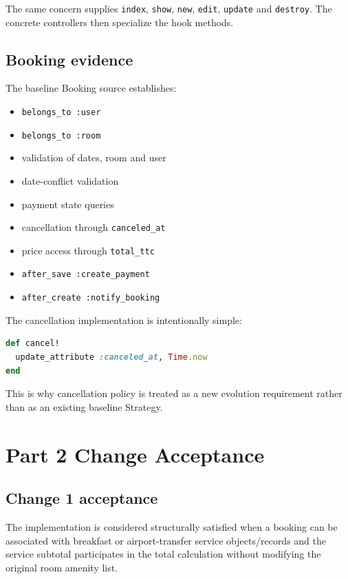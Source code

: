 \documentclass[10pt,a4paper]{article}
\newcommand{\code}[1]{\texttt{\small #1}}
\begin{document}
The same concern supplies \code{index}, \code{show}, \code{new}, \code{edit}, \code{update} and \code{destroy}. The concrete controllers then specialize the hook methods.

\subsection{Booking evidence}

The baseline Booking source establishes:

\begin{itemize}[leftmargin=*]
\item \code{belongs\_to :user}
\item \code{belongs\_to :room}
\item validation of dates, room and user
\item date-conflict validation
\item payment state queries
\item cancellation through \code{canceled\_at}
\item price access through \code{total\_ttc}
\item \code{after\_save :create\_payment}
\item \code{after\_create :notify\_booking}
\end{itemize}

The cancellation implementation is intentionally simple:

\begin{lstlisting}[language=Ruby,caption={Baseline cancellation behavior}]
def cancel!
  update_attribute :canceled_at, Time.now
end
\end{lstlisting}

This is why cancellation policy is treated as a new evolution requirement rather than as an existing baseline Strategy.

\section{Part 2 Change Acceptance}

\subsection{Change 1 acceptance}

The implementation is considered structurally satisfied when a booking can be associated with breakfast or airport-transfer service objects/records and the service subtotal participates in the total calculation without modifying the original room amenity list.
\end{document}

